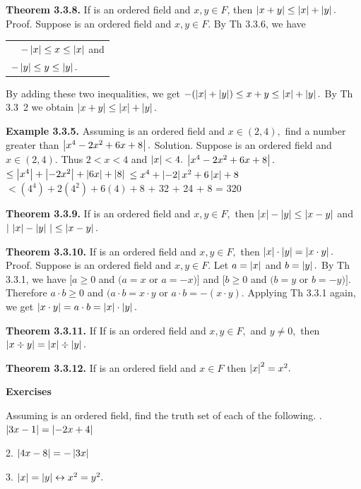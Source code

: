\begin{large}
\textbf{Theorem 3.3.8.} If \of is an ordered field and $x,y\in F$, then $\left|x + y\right| \leq \left|x\right| + \left|y\right|.$\nl
Proof. Suppose \of is an ordered field and $x,y\in F.$ By Th 3.3.6, we have
\begin{tabular}{l }
$\,\,\,\,\,\,-\left|x\right| \leq x \leq \left|x\right|$ and \\
$-\left|y\right|\leq y \leq \left|y\right|.$\\
\end{tabular}\nl
By adding these two inequalities, we get $-(\left|x\right| + \left|y\right|) \leq x+y \leq \left|x\right| + \left|y\right|.$ By Th 3.3~2 we obtain $\left|x + y\right| \leq \left|x\right| + \left|y\right|.$\nl

\textbf{Example 3.3.5.} Assuming \of is an ordered field and $x\in (2,4),$ find a number greater than $\left|x^4 - 2x^{2} + 6x + 8\right|.$\nl
Solution. Suppose \of is an ordered field and $x\in (2,4).$ Thus $2<x<4$ and $\left|x\right| < 4.$\nl
$\left|x^4 - 2x^{2} + 6x + 8\right|.$\nl
$\leq \left|x^4\right| + \left|-2x^{2}\right|+ \left|6x\right| + \left|8\right|$\nl
$\leq x^4 + \left|-2\right|x^{2} + 6\left|x\right| +8 $\nl
$<(4^{4})+2(4^{2}) + 6(4) + 8$  + 32 + 24 + 8 = 320 \nl

\newpage

\textbf{Theorem 3.3.9.} If \of is an ordered field and $x,y\in F,$ then
$\left|x\right| - \left|y\right| \leq \left|x - y\right|$ and $\left|\,\,\left|x\right|- \left|y\right|\,\, \right| \leq \left|x - y\right|.$\nl

\textbf{Theorem 3.3.10.} If \of is an ordered field and $x,y\in F,$ then
$\left|x\right|\cdot\left|y\right| = \left|x\cdot y\right|. $\nl
Proof. Suppose  \of is an ordered field and $x,y\in F.$  Let $a=\left|x\right|$ and $b=\left|y\right|.$ By Th 3.3.1, we have $[a \geq 0$ and $(a = x$ or $a = -x)]$ and $[b \geq 0$ and $(b = y$ or $b = -y)].$ Therefore $a\cdot b  \geq 0$  and $(a\cdot b = x\cdot y$ or $a\cdot b = -(x\cdot y).$ Applying Th 3.3.1 again, we get $\left|x\cdot y\right| = a\cdot b =\left|x\right|\cdot \left|y\right|.$\nl

\textbf{Theorem 3.3.11.} If If \of is an ordered field and $x,y\in F,$ and $y\neq 0,$ then $\left|x \div y\right| = \left|x\right| \div \left|y\right|.$\nl

\textbf{Theorem 3.3.12.} If  \of is an ordered field and $x\in F$ then ${\left|x\right|}^{2}  = x^{2}. $\nl

\textbf{Exercises} \nl

Assuming \of  is an ordered field, find the truth set of each of the following. . $ \left|3x - 1\right| = \left|-2x + 4\right| $\nl

2. $\left|4x - 8\right| = -\left|3x\right|$ \nl

3. $\left|x\right| = \left|y\right|  \leftrightarrow x^{2}= y^{2}.$ \nl


\end{large}
